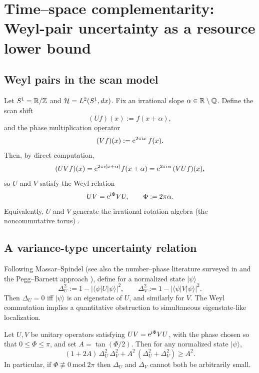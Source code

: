 \section[Time--space complementarity]{Time--space complementarity: Weyl-pair uncertainty as a resource lower bound}
\label{sec:complementarity}

\subsection{Weyl pairs in the scan model}
Let $S^1=\mathbb{R}/\mathbb{Z}$ and $\mathcal{H}=L^2(S^1,dx)$.
Fix an irrational slope $\alpha\in\mathbb{R}\setminus\mathbb{Q}$.
Define the scan shift
\begin{equation}
(Uf)(x):=f(x+\alpha),
\end{equation}
and the phase multiplication operator
\begin{equation}
(Vf)(x):=\mathrm{e}^{2\pi \mathrm{i} x}\,f(x).
\end{equation}
Then, by direct computation,
\begin{equation}
(UVf)(x)=\mathrm{e}^{2\pi \mathrm{i} (x+\alpha)}f(x+\alpha)=\mathrm{e}^{2\pi \mathrm{i} \alpha}\,(VUf)(x),
\end{equation}
so $U$ and $V$ satisfy the Weyl relation
\begin{equation}
UV=\mathrm{e}^{\mathrm{i}\Phi}VU,\qquad \Phi:=2\pi\alpha.
\end{equation}
Equivalently, $U$ and $V$ generate the irrational rotation algebra (the noncommutative torus) \cite{Rieffel1981}.

\subsection{A variance-type uncertainty relation}
Following Massar--Spindel \cite{MassarSpindel2008} (see also the number--phase literature surveyed in \cite{CarruthersNieto1968} and the Pegg--Barnett approach \cite{PeggBarnett1989}), define for a normalized state $|\psi\rangle$
\begin{equation}
\Delta_U^2:=1-\bigl|\langle\psi|U|\psi\rangle\bigr|^2,
\qquad
\Delta_V^2:=1-\bigl|\langle\psi|V|\psi\rangle\bigr|^2.
\end{equation}
Then $\Delta_U=0$ iff $|\psi\rangle$ is an eigenstate of $U$, and similarly for $V$.
The Weyl commutation implies a quantitative obstruction to simultaneous eigenstate-like localization.

\begin{theorem}
\label{thm:weyl_uncertainty}
Let $U,V$ be unitary operators satisfying $UV=\mathrm{e}^{\mathrm{i}\Phi}VU$, with the phase chosen so that $0\le\Phi\le\pi$, and set $A=\tan(\Phi/2)$. Then for any normalized state $|\psi\rangle$,
\begin{equation}
(1+2A)\,\Delta_U^2\,\Delta_V^2 + A^2\,(\Delta_U^2+\Delta_V^2)\ge A^2.
\label{eq:weyl_variance_uncertainty}
\end{equation}
In particular, if $\Phi\not\equiv 0\ \mathrm{mod}\ 2\pi$ then $\Delta_U$ and $\Delta_V$ cannot both be arbitrarily small.
\end{theorem}


